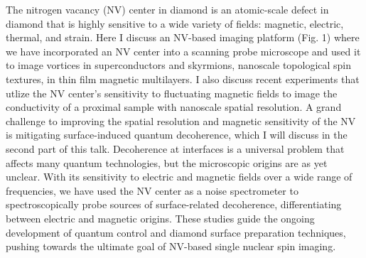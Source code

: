 The nitrogen vacancy (NV) center in diamond is an atomic-scale defect in diamond that is highly sensitive to a wide variety of fields: magnetic, electric, thermal, and strain. Here I discuss an NV-based imaging platform (Fig. 1) where we have incorporated an NV center into a scanning probe microscope and used it to image vortices in superconductors and skyrmions, nanoscale topological spin textures, in thin film magnetic multilayers. I also discuss recent experiments that utlize the NV center's sensitivity to fluctuating magnetic fields to image the conductivity of a proximal sample with nanoscale spatial resolution. A grand challenge to improving the spatial resolution and magnetic sensitivity of the NV is mitigating surface-induced quantum decoherence, which I will discuss in the second part of this talk. Decoherence at interfaces is a universal problem that affects many quantum technologies, but the microscopic origins are as yet unclear. With its sensitivity to electric and magnetic fields over a wide range of frequencies, we have used the NV center as a noise spectrometer to spectroscopically probe sources of surface-related decoherence, differentiating between electric and magnetic origins. These studies guide the ongoing development of quantum control and diamond surface preparation techniques, pushing towards the ultimate goal of NV-based single nuclear spin imaging.